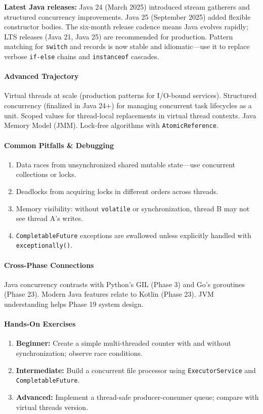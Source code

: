 \documentclass[11pt, a4paper, oneside]{report}
\begin{document}
\textbf{Latest Java releases:} Java 24 (March 2025) introduced stream gatherers and structured concurrency improvements. Java 25 (September 2025) added flexible constructor bodies. The six-month release cadence means Java evolves rapidly; LTS releases (Java 21, Java 25) are recommended for production. Pattern matching for \texttt{switch} and records is now stable and idiomatic---use it to replace verbose \texttt{if-else} chains and \texttt{instanceof} cascades.

\paragraph{Advanced Trajectory} Virtual threads at scale (production patterns for I/O-bound services). Structured concurrency (finalized in Java 24+) for managing concurrent task lifecycles as a unit. Scoped values for thread-local replacements in virtual thread contexts. Java Memory Model (JMM). Lock-free algorithms with \texttt{AtomicReference}.

\paragraph{Common Pitfalls \& Debugging}
\begin{enumerate}[leftmargin=*]
\item Data races from unsynchronized shared mutable state---use concurrent collections or locks.
\item Deadlocks from acquiring locks in different orders across threads.
\item Memory visibility: without \texttt{volatile} or synchronization, thread B may not see thread A's writes.
\item \texttt{CompletableFuture} exceptions are swallowed unless explicitly handled with \texttt{exceptionally()}.
\end{enumerate}

\paragraph{Cross-Phase Connections} Java concurrency contrasts with Python's GIL (Phase 3) and Go's goroutines (Phase 23). Modern Java features relate to Kotlin (Phase 23). JVM understanding helps Phase 19 system design.

\paragraph{Hands-On Exercises}
\begin{enumerate}[leftmargin=*]
\item \textbf{Beginner:} Create a simple multi-threaded counter with and without synchronization; observe race conditions.
\item \textbf{Intermediate:} Build a concurrent file processor using \texttt{ExecutorService} and \texttt{CompletableFuture}.
\item \textbf{Advanced:} Implement a thread-safe producer-consumer queue; compare with virtual threads version.
\end{enumerate}
\end{document}
